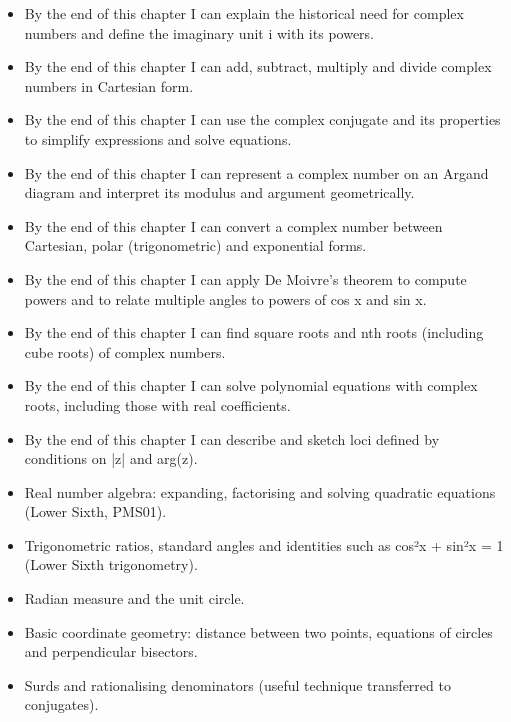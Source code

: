 \documentclass[11pt]{article}
\begin{document}
\begin{objectifs}
\begin{itemize}
\item By the end of this chapter I can explain the historical need for complex numbers and define the imaginary unit i with its powers.
\item By the end of this chapter I can add, subtract, multiply and divide complex numbers in Cartesian form.
\item By the end of this chapter I can use the complex conjugate and its properties to simplify expressions and solve equations.
\item By the end of this chapter I can represent a complex number on an Argand diagram and interpret its modulus and argument geometrically.
\item By the end of this chapter I can convert a complex number between Cartesian, polar (trigonometric) and exponential forms.
\item By the end of this chapter I can apply De Moivre's theorem to compute powers and to relate multiple angles to powers of cos x and sin x.
\item By the end of this chapter I can find square roots and nth roots (including cube roots) of complex numbers.
\item By the end of this chapter I can solve polynomial equations with complex roots, including those with real coefficients.
\item By the end of this chapter I can describe and sketch loci defined by conditions on |z| and arg(z).
\end{itemize}
\end{objectifs}

\begin{prerequis}
\begin{itemize}
\item Real number algebra: expanding, factorising and solving quadratic equations (Lower Sixth, PMS01).
\item Trigonometric ratios, standard angles and identities such as cos²x + sin²x = 1 (Lower Sixth trigonometry).
\item Radian measure and the unit circle.
\item Basic coordinate geometry: distance between two points, equations of circles and perpendicular bisectors.
\item Surds and rationalising denominators (useful technique transferred to conjugates).
\end{itemize}
\end{prerequis}
\end{document}
